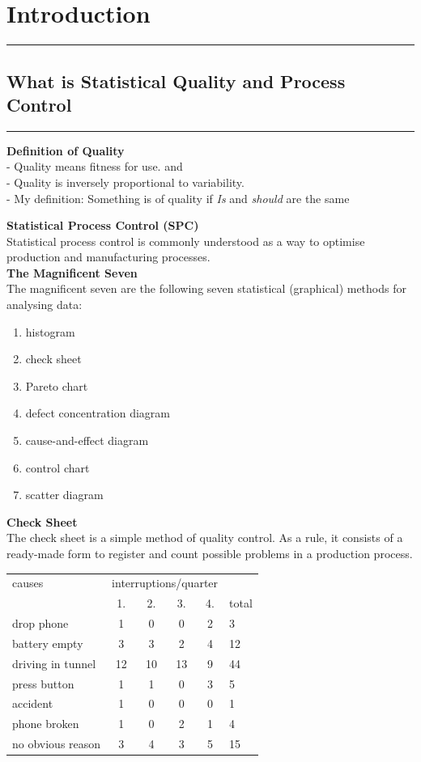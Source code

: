 \section{Introduction}
\noindent\rule[\linienAbstand]{\linewidth}{\linienDickeDick}

\subsection{What is Statistical Quality and Process Control}
\noindent\rule[\linienAbstand]{\linewidth}{\linienDicke}
\textbf{Definition of Quality}\\
- Quality means fitness for use. and\\
- Quality is inversely proportional to variability.\\
- My definition: Something is of quality if \emph{Is} and \emph{should} are the same


\textbf{Statistical Process Control (SPC)}\\
Statistical process control is commonly understood as a way to optimise production and manufacturing processes.\\

\textbf{The Magnificent Seven}\\
The magnificent seven are the following seven statistical (graphical) methods for analysing data:
\begin{enumerate}
  \item histogram
  \item check sheet
  \item Pareto chart
  \item defect concentration diagram
  \item cause-and-effect diagram
  \item control chart
  \item scatter diagram
\end{enumerate}

\textbf{Check Sheet}\\
The check sheet is a simple method of quality control. As a rule, it consists of a ready-made form to register and count possible problems in a production process.\\
\begin{table}[H]
  \tiny
  \centering
  \begin{tabular}{l|cccc|l}
    causes            & \multicolumn{4}{l|}{interruptions/quarter} &  \\
                      & 1. & 2. & 3. & 4. & total \\ \hline
    drop phone        & 1  & 0  & 0 & 2  & 3\\
    battery empty     & 3  & 3  & 2 & 4  & 12\\
    driving in tunnel & 12 & 10 & 13 & 9 & 44\\
    press button      & 1  & 1  & 0  & 3 & 5\\
    accident          & 1  & 0  & 0  & 0 & 1\\
    phone broken      & 1  & 0  & 2  & 1 & 4\\
    no obvious reason & 3  & 4  & 3  & 5 & 15
  \end{tabular}
\end{table}

